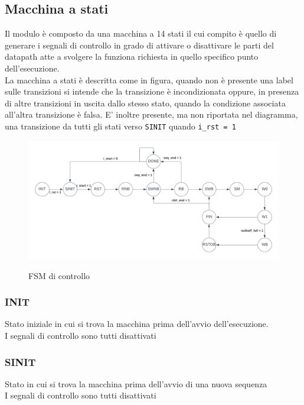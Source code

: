\documentclass[12pt, a4paper]{article}
\begin{document}
\pagebreak

\subsection{Macchina a stati}

Il modulo è composto da una macchina a 14 stati il cui compito è quello di generare
i segnali di controllo in grado di attivare o disattivare le parti del datapath atte a
svolgere la funziona richiesta in quello specifico punto dell'esecuzione.\\

La macchina a stati è descritta come in figura, quando non è presente una label sulle transizioni
si intende che la transizione è incondizionata oppure, in presenza di altre transizioni
in uscita dallo stesso stato, quando la condizione associata all'altra transizione è falsa.
E' inoltre presente, ma non riportata nel diagramma, una transizione da tutti gli stati 
verso \texttt{SINIT} quando \texttt{i\_rst = 1}

\begin{figure}[!h]
    \centering
    \includegraphics[scale=0.3]{fsm_controllo.png}
    \label{fig:ctrl_fsm}
    \caption{FSM di controllo}
    
\end{figure}

\subsubsection{INIT}
Stato iniziale in cui si trova la macchina prima dell'avvio dell'esecuzione.\\
I segnali di controllo sono tutti disattivati

\subsubsection{SINIT}
Stato in cui si trova la macchina prima dell'avvio di una nuova sequenza\\
I segnali di controllo sono tutti disattivati
\end{document}
